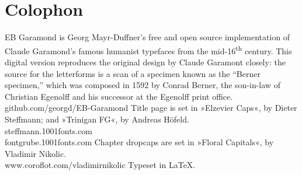 \documentclass[
a5paper,
BCOR=7mm,
twoside,
DIV=calc,
11pt,
usegeometry,
chapterprefix,
headings=big]{scrbook} %
\begin{document}








































\clearpage
{}
\chapter*{Colophon}
\begin{center}
EB Garamond is Georg Mayr-Duffner's free and open source implementation of Claude Garamond’s famous humanist typefaces from the mid-16\textsuperscript{th} century. This digital version reproduces the original design by Claude Garamont closely: the source for the letterforms is a scan of a specimen known as the \enquote{Berner specimen,} which was composed in 1592 by Conrad Berner, the son-in-law of Christian Egenolff and his successor at the Egenolff print office.  \\github.com/georgd/EB-Garamond
\vfill
Title page is set in »Elzevier Caps«, by Dieter Steffmann; and »Trinigan FG«, by Andreas Höfeld.\\steffmann.1001fonts.com\\fontgrube.1001fonts.com
\vfill
Chapter dropcaps are set in »Floral Capitals«, by 
Vladimir Nikolic.\\www.coroflot.com/vladimirnikolic
\vfill
Typeset in \LaTeX{}.
\end{center}
\thispagestyle{empty}
\end{document}
